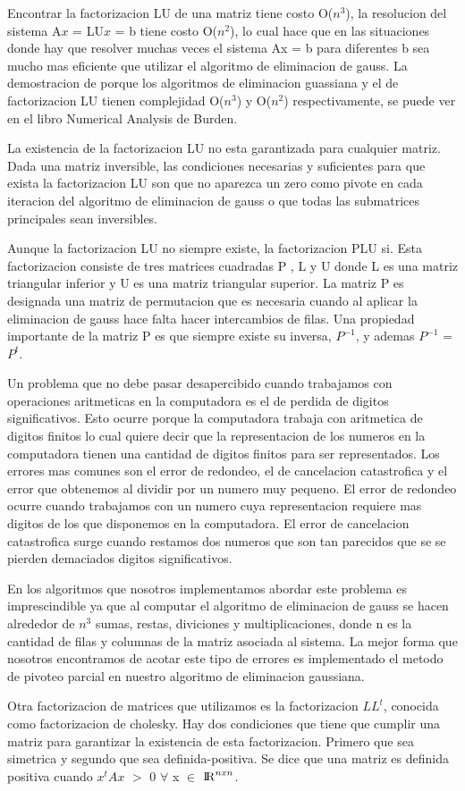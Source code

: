 Encontrar la factorizacion LU de una matriz tiene costo O($n^{3}$), la resolucion del sistema A$x$ = LU$x$ = b tiene costo O($n^{2}$), lo cual hace que en las situaciones donde hay que resolver muchas veces el sistema Ax = b para diferentes b sea mucho mas eficiente que utilizar el algoritmo de eliminacion de gauss. 
La demostracion de porque los algoritmos de eliminacion guassiana y el de factorizacion LU tienen complejidad O($n^{3}$) y O($n^{2}$) respectivamente, se puede ver en el libro Numerical Analysis de Burden. \par
\indent La existencia de la factorizacion LU no esta garantizada para cualquier matriz. 
Dada una matriz inversible, las condiciones necesarias y suficientes para que exista la factorizacion LU son que no aparezca un zero como pivote en cada iteracion del algoritmo de eliminacion de gauss o que todas las submatrices principales sean inversibles.\par
Aunque la factorizacion LU no siempre existe, la factorizacion PLU si. 
Esta factorizacion consiste de tres matrices cuadradas P , L y U donde L es una matriz triangular inferior y U es  una matriz triangular superior.  
La matriz P es designada una matriz de permutacion que es necesaria cuando al aplicar la eliminacion de gauss hace falta hacer intercambios de filas.
Una propiedad importante de la matriz P es que siempre existe su inversa, $P^{-1}$, y ademas $P^{-1}$ = $P^{t}$. \par
\indent Un problema que no debe pasar desapercibido cuando trabajamos con operaciones aritmeticas en la computadora es el de perdida de digitos significativos. 
Esto ocurre porque la computadora trabaja con aritmetica de digitos finitos lo cual quiere decir que la representacion de los numeros en la computadora tienen una cantidad de digitos finitos para ser representados. 
Los errores mas comunes son el error de redondeo, el de cancelacion catastrofica y el error que obtenemos al dividir por un numero muy pequeno. 
El error de redondeo ocurre cuando trabajamos con un numero cuya representacion requiere mas digitos de los que disponemos en la computadora. 
El error de cancelacion catastrofica surge cuando restamos dos numeros que son tan parecidos que se se pierden demaciados digitos significativos.\par
\indent En los algoritmos que nosotros implementamos abordar este problema es imprescindible ya que al computar el algoritmo de eliminacion de gauss se hacen alrededor de $n^{3}$ sumas, restas, diviciones y multiplicaciones, donde n es la cantidad de filas y columnas de la matriz asociada al sistema. 
La mejor forma que nosotros encontramos de acotar este tipo de errores es implementado el metodo de pivoteo parcial en nuestro algoritmo de eliminacion gaussiana.\par
\indent Otra factorizacion de matrices que utilizamos es la factorizacion $LL^{t}$, conocida como factorizacion de cholesky. Hay dos condiciones que tiene que cumplir una matriz para garantizar la existencia de esta factorizacion. 
Primero que sea simetrica y segundo que sea definida-positiva. Se dice que una matriz es definida positiva cuando $x^{t}Ax$ $>$ 0 $\forall$ x $\in$ ${\rm I\!R}^{nxn}$.
